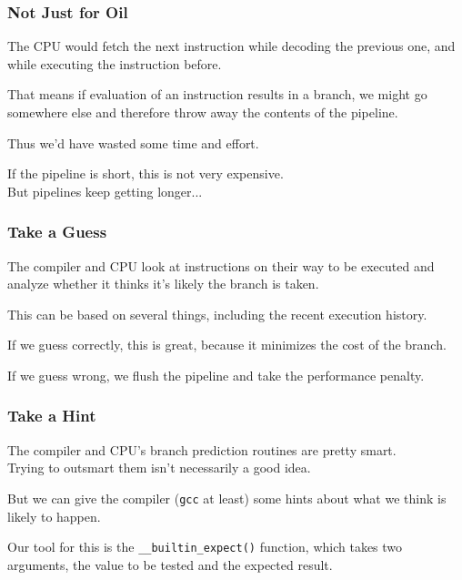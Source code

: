 \begin{frame}
\frametitle{Not Just for Oil}

The CPU would fetch the next instruction while decoding the previous one, and while executing the instruction before. 

That means if evaluation of an instruction results in a branch, we might go somewhere else and therefore throw away the contents of the pipeline. 

Thus we'd have wasted some time and effort. 

If the pipeline is short, this is not very expensive.\\
\quad But pipelines keep getting longer... 

\end{frame}



\begin{frame}
\frametitle{Take a Guess}

The compiler and CPU look at instructions on their way to be executed and analyze whether it thinks it's likely the branch is taken. 

This can be based on several things, including the recent execution history. 

If we guess correctly, this is great, because it minimizes the cost of the branch. 

If we guess wrong, we flush the pipeline and take the performance penalty.

\end{frame}



\begin{frame}
\frametitle{Take a Hint}

The compiler and CPU's branch prediction routines are pretty smart.\\
\quad Trying to outsmart them isn't necessarily a good idea. 

But we can give the compiler (\texttt{gcc} at least) some hints about what we think is likely to happen. 

Our tool for this is the \texttt{\_\_builtin\_expect()} function, which takes two arguments, the value to be tested and the expected result.

\end{frame}


